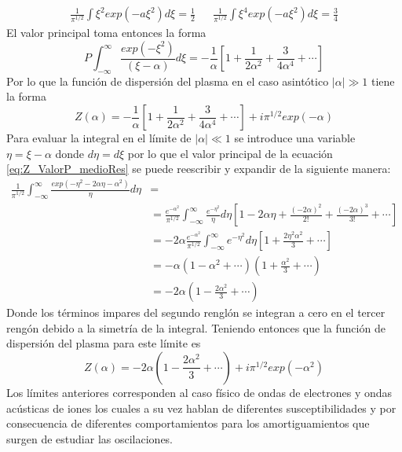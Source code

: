 \documentclass[../tesis_main_file.tex]{subfile}
\begin{document}
\begin{align*}
\frac{1}{\pi ^{1/2}}\int \xi ^2 exp(-a\xi ^2)d\xi =\frac{1}{2}& &\frac{1}{\pi ^{1/2}}\int \xi ^4 exp(-a\xi ^2)d\xi =\frac{3}{4}
\end{align*}
El valor principal toma entonces la forma 
\begin{equation}
\label{eq:ValorP_alpha_gg_1}
P\int ^{\infty}_{-\infty} \frac{exp(-\xi ^2)}{(\xi -\alpha)}d\xi = -\frac{1}{\alpha}\left[1 + \frac{1}{2\alpha^2}+\frac{3}{4\alpha^4}+\cdots\right]
\end{equation}
Por lo que la función de dispersión del plasma en el caso asintótico $|\alpha|\gg 1$ tiene la forma
\begin{equation}
\label{eq:Z_aprox_alpha_gg_1}
Z(\alpha)= -\frac{1}{\alpha}\left[1 + \frac{1}{2\alpha^2}+\frac{3}{4\alpha^4}+\cdots\right]+ i\pi ^{1/2}exp(-\alpha)
\end{equation}
Para evaluar la integral en el límite de $|\alpha |\ll 1$ se introduce una variable $\eta = \xi -\alpha$ donde $d\eta = d\xi$ por lo que el valor principal de la ecuación \ref{eq:Z_ValorP_medioRes} se puede reescribir y expandir de la siguiente manera:
\begin{equation}
\begin{split}
\frac{1}{\pi^{1/2}}\int^{\infty}_{-\infty}\frac{exp(-\eta ^2 - 2\alpha \eta - \alpha^2 )}{\eta}d\eta &=\\
&=\frac{e^{-\alpha^2}}{\pi^{1/2}}\int^{\infty}_{-\infty}\frac{e^{-\eta^2}}{\eta}d\eta \left[1-2\alpha \eta + \frac{(-2\alpha)^2}{2!}+\frac{(-2\alpha)^3}{3!}+\cdots\right]\\
&=-2\alpha\frac{e^{-\alpha^2}}{\pi^{1/2}}\int^{\infty}_{-\infty}e^{-\eta^2}d\eta\left[1+\frac{2\eta^2\alpha^2}{3}+\cdots\right]\\
&=-\alpha \left(1-\alpha^2+\cdots\right)\left(1+\frac{\alpha^2}{3}+\cdots\right)\\
&=-2\alpha \left(1-\frac{2\alpha^2}{3} + \cdots \right)
\end{split}
\end{equation}
Donde los términos impares del segundo renglón se integran a cero en el tercer rengón debido a la simetría de la integral.
Teniendo entonces que la función de dispersión del plasma para este límite es
\begin{equation}
\label{eq:Z_aprox_alpha_ll_1}
Z(\alpha)=-2\alpha \left(1-\frac{2\alpha^2}{3}+\cdots \right)+i\pi^{1/2}exp(-\alpha^2)
\end{equation}
Los límites anteriores corresponden al caso físico de ondas de electrones y ondas acústicas de iones los cuales a su vez hablan de diferentes susceptibilidades y por consecuencia de diferentes comportamientos para los amortiguamientos que surgen de estudiar las oscilaciones.
\end{document}
